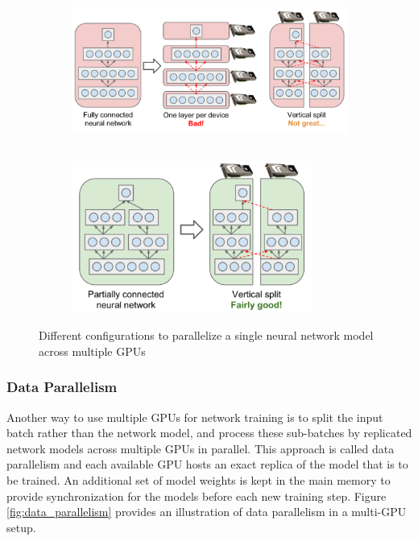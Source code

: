 \begin{figure}[H]
    \begin{subfigure}[c]{\textwidth}
        \centering
        \includegraphics[height=5cm]{img_approach/model_parallelism1}
        \vspace{0.5cm}
    \end{subfigure}
    \begin{subfigure}[c]{\textwidth}
        \centering
        \includegraphics[height=5cm]{img_approach/model_parallelism2}
    \end{subfigure}
    \caption{Different configurations to parallelize a single neural network model across multiple GPUs \cite{geron_hands-machine_2017}}
    \label{fig:model_parallelism}
\end{figure}


\subsubsection{Data Parallelism}
Another way to use multiple GPUs for network training is to split the input batch rather than the network model, and process these sub-batches by replicated network models across multiple GPUs in parallel.
This approach is called data parallelism and each available GPU hosts an exact replica of the model that is to be trained.
An additional set of model weights is kept in the main memory to provide synchronization for the models before each new training step.
Figure \ref{fig:data_parallelism} provides an illustration of data parallelism in a multi-GPU setup.

